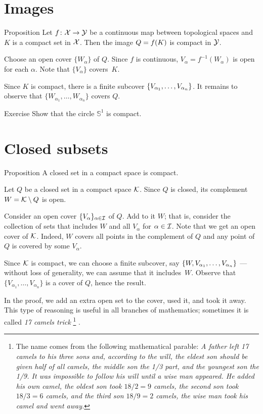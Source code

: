 \section{Images}

\begin{thm}{Proposition}\label{prop:comp-image}
Let $f\colon\mathcal{X}\to\mathcal{Y}$ be a continuous map between topological spaces and $K$ is a compact set in $\mathcal{X}$.
Then the image $Q\z=f(K)$ is compact in $\mathcal{Y}$.
\end{thm}

Choose an open cover $\{W_\alpha\}$ of $Q$.
Since $f$ is continuous, $V_\alpha=f^{-1}(W_\alpha)$ is open for each $\alpha$.
Note that $\{V_\alpha\}$ covers~$K$.

Since $K$ is compact, there is a finite subcover $\{V_{\alpha_1},\z\dots, V_{\alpha_n}\}$.
It remains to observe that $\{W_{\alpha_1},\dots, W_{\alpha_n}\}$ covers $Q$.
\qeds

\begin{thm}{Exercise}\label{ex:S1-compact}
Show that the circle $\mathbb{S}^1$ is compact.
\end{thm}

\section{Closed subsets}

\begin{thm}{Proposition}\label{prop:compact-closed}
A closed set in a compact space is compact.
\end{thm}

Let $Q$ be a closed set in a compact space $\mathcal{K}$.
Since $Q$ is closed, its complement $W=\mathcal{K}\setminus Q$ is open.

Consider an open cover $\{V_\alpha\}_{\alpha\in\mathcal{I}}$ of $Q$.
Add to it $W$; that is, consider the collection of sets that includes $W$ and all $V_\alpha$ for $\alpha\in\mathcal{I}$.
Note that we get an open cover of $\mathcal{K}$.
Indeed, $W$ covers all points in the complement of $Q$ and any point of $Q$ is covered by some $V_\alpha$.

Since $\mathcal{K}$ is compact, we can choose a finite subcover, say $\{W,V_{\alpha_1},\z\dots,V_{\alpha_n}\}$ --- without loss of generality, we can assume that it includes~$W$.
Observe that $\{V_{\alpha_1},\dots,V_{\alpha_n}\}$ is a cover of $Q$, hence the result.
\qeds

In the proof, we add an extra open set to the cover, used it, and took it away.
This type of reasoning is useful in all branches of mathematics;
sometimes it is called \emph{17 camels trick}%
\footnote{The name comes from the following mathematical parable:
\textit{A father left 17 camels to his three sons and, according to the will,
the eldest son should be given half of all camels,
the middle son the 1/3 part,
and the youngest son the 1/9.
It was impossible to follow his will until a wise man appeared.
He added his own camel, the oldest son took $18/2=9$ camels, the second son took $18/3=6$ camels, and the third son $18/9=2$ camels, the wise man took his camel and went away.}}
\cite{17-camels}.

